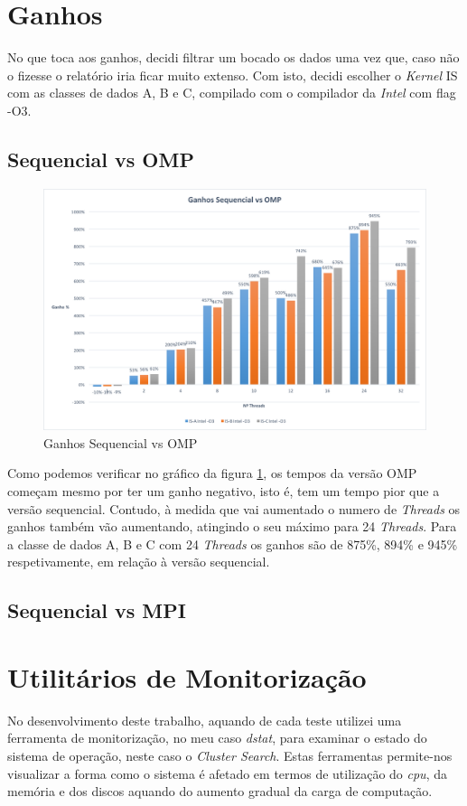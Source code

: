 \documentclass[conference,compsoc]{IEEEtran}
\begin{document}
\section{Ganhos}
No que toca aos ganhos, decidi filtrar um bocado os dados uma vez que, caso não o fizesse o relatório iria ficar muito extenso. Com isto, decidi escolher o \textit{Kernel} IS com as classes de dados A, B e C, compilado com o compilador da \textit{Intel} com flag -O3.

\subsection{Sequencial vs OMP}

\begin{figure}[h!]
\centering
\includegraphics[scale=0.325]{ganhos_seq_vs_omp.png}
\caption{Ganhos Sequencial vs OMP}
\label{fig:ganhos_seq_vs_omp}
\end{figure}

Como podemos verificar no gráfico da figura \ref{fig:ganhos_seq_vs_omp}, os tempos da versão OMP começam mesmo por ter um ganho negativo, isto é, tem um tempo pior que a versão sequencial. Contudo, à medida que vai aumentado o numero de \textit{Threads} os ganhos também vão aumentando, atingindo o seu máximo para 24 \textit{Threads}. Para a classe de dados A, B e C com 24 \textit{Threads} os ganhos são de 875\%, 894\% e 945\% respetivamente, em relação à versão sequencial.
\subsection{Sequencial vs MPI}

\section{Utilitários de Monitorização}
No desenvolvimento deste trabalho, aquando de cada teste utilizei uma ferramenta de monitorização, no meu caso \textit{dstat}, para examinar o estado do sistema de operação, neste caso o \textit{Cluster Search}. Estas ferramentas permite-nos visualizar a forma como o sistema é afetado em termos de utilização do \textit{cpu}, da memória e dos discos aquando do aumento gradual da carga de computação.
\end{document}
